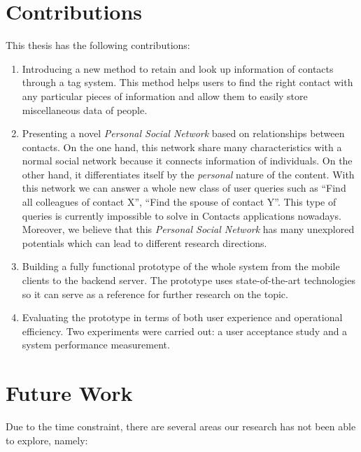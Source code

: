 \section{Contributions}
This thesis has the following contributions:

\begin{enumerate}
    \item Introducing a new method to retain and look up information of contacts through a tag system. This method helps users to find the right contact with any particular pieces of information and allow them to easily store miscellaneous data of people.
    \item Presenting a novel \textit{Personal Social Network} based on relationships between contacts. On the one hand, this network share many characteristics with a normal social network because it connects information of individuals. On the other hand, it differentiates itself by the \textit{personal} nature of the content. With this network we can answer a whole new class of user queries such as ``Find all colleagues of contact X'', ``Find the spouse of contact Y''. This type of queries is currently impossible to solve in Contacts applications nowadays. Moreover, we believe that this \textit{Personal Social Network} has many unexplored potentials which can lead to different research directions.
    \item Building a fully functional prototype of the whole system from the mobile clients to the backend server. The prototype uses state-of-the-art technologies so it can serve as a reference for further research on the topic.
    \item Evaluating the prototype in terms of both user experience and operational efficiency. Two experiments were carried out: a user acceptance study and a system performance measurement.
\end{enumerate}

\section{Future Work}
Due to the time constraint, there are several areas our research has not been able to explore, namely:

